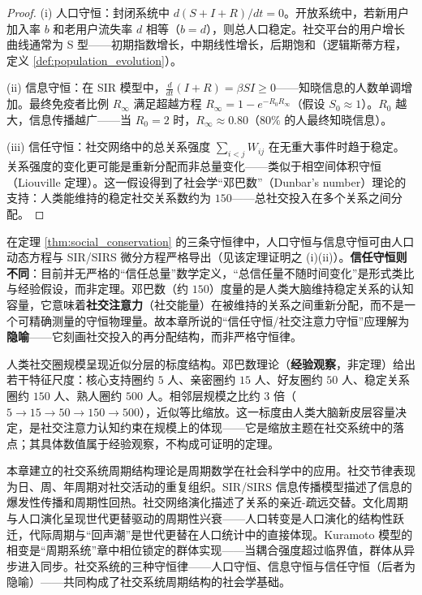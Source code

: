 \begin{proof}
(i) 人口守恒：封闭系统中 $d(S+I+R)/dt = 0$。开放系统中，若新用户加入率 $b$ 和老用户流失率 $d$ 相等（$b=d$），则总人口稳定。社交平台的用户增长曲线通常为 S 型——初期指数增长，中期线性增长，后期饱和（逻辑斯蒂方程，定义 \ref{def:population_evolution}）。

(ii) 信息守恒：在 SIR 模型中，$\frac{d}{dt}(I+R) = \beta S I \ge 0$——知晓信息的人数单调增加。最终免疫者比例 $R_{\infty}$ 满足超越方程 $R_{\infty} = 1 - e^{-R_0 R_{\infty}}$（假设 $S_0 \approx 1$）。$R_0$ 越大，信息传播越广——当 $R_0 = 2$ 时，$R_{\infty} \approx 0.80$（$80\%$ 的人最终知晓信息）。

(iii) 信任守恒：社交网络中的总关系强度 $\sum_{i<j} W_{ij}$ 在无重大事件时趋于稳定。关系强度的变化更可能是重新分配而非总量变化——类似于相空间体积守恒（Liouville 定理）。这一假设得到了社会学“邓巴数”（Dunbar's number）理论的支持：人类能维持的稳定社交关系数约为 $150$——总社交投入在多个关系之间分配。
\end{proof}

\begin{remark}[信任守恒的隐喻性质]\label{ch27_trust_metaphor}
在定理 \ref{thm:social_conservation} 的三条守恒律中，人口守恒与信息守恒可由人口动态方程与 SIR/SIRS 微分方程严格导出（见该定理证明之 (i)(ii)）。\textbf{信任守恒则不同}：目前并无严格的“信任总量”数学定义，“总信任量不随时间变化”是形式类比与经验假设，而非定理。邓巴数（约 $150$）度量的是人类大脑维持稳定关系的认知容量，它意味着\textbf{社交注意力}（社交能量）在被维持的关系之间重新分配，而不是一个可精确测量的守恒物理量。故本章所说的“信任守恒/社交注意力守恒”应理解为\textbf{隐喻}——它刻画社交投入的再分配结构，而非严格守恒律。
\end{remark}

\begin{remark}\label{ch27_dunbar_scaling}
人类社交圈规模呈现近似分层的标度结构。邓巴数理论（\textbf{经验观察}，非定理）给出若干特征尺度：核心支持圈约 $5$ 人、亲密圈约 $15$ 人、好友圈约 $50$ 人、稳定关系圈约 $150$ 人、熟人圈约 $500$ 人。相邻层规模之比约 $3$ 倍（$5\to15\to50\to150\to500$），近似等比缩放。这一标度由人类大脑新皮层容量决定，是社交注意力认知约束在规模上的体现——它是缩放主题在社交系统中的落点；其具体数值属于经验观察，不构成可证明的定理。
\end{remark}

\begin{remark}[与全书的衔接]
本章建立的社交系统周期结构理论是周期数学在社会科学中的应用。社交节律表现为日、周、年周期对社交活动的重复组织。SIR/SIRS 信息传播模型描述了信息的爆发性传播和周期性回热。社交网络演化描述了关系的亲近-疏远交替。文化周期与人口演化呈现世代更替驱动的周期性兴衰——人口转变是人口演化的结构性跃迁，代际周期与“回声潮”是世代更替在人口统计中的直接体现。Kuramoto 模型的相变是“周期系统”章中相位锁定的群体实现——当耦合强度超过临界值，群体从异步进入同步。社交系统的三种守恒律——人口守恒、信息守恒与信任守恒（后者为隐喻）——共同构成了社交系统周期结构的社会学基础。
\end{remark}

